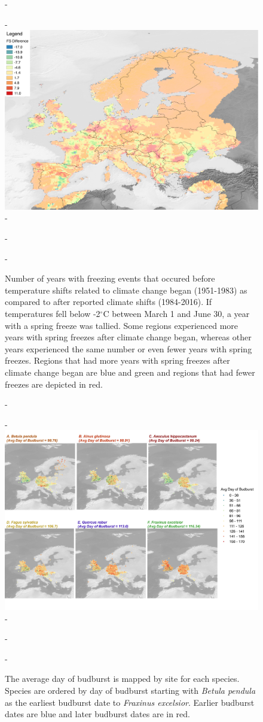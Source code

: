 \documentclass{article}\usepackage[]{graphicx}\usepackage[]{color}
\begin{document}
{\begin{figure} [H]
  -\begin{center}
  -\includegraphics[width=12cm]{..//figures/FS_Diff.pdf}
  -\caption{Number of years with freezing events that occured before temperature shifts related to climate change began (1951-1983) as compared to after reported climate shifts (1984-2016). If temperatures fell below -2$^{\circ}$C between March 1 and June 30, a year with a spring freeze was tallied. Some regions experienced more years with spring freezes after climate change began, whereas other years experienced the same number or even fewer years with spring freezes. Regions that had more years with spring freezes after climate change began are blue and green and regions that had fewer freezes are depicted in red.}\label{fig:region}
  -\end{center}
  -\end{figure}}
  
{\begin{figure} [H]
  -\begin{center}
  -\includegraphics[width=14cm]{..//figures/BB_gis.pdf}
  -\caption{The average day of budburst is mapped by site for each species. Species are ordered by day of budburst starting with \textit{Betula pendula} as the earliest budburst date to \textit{Fraxinus excelsior}. Earlier budburst dates are blue and later budburst dates are in red. }\label{fig:bbmap}
  -\end{center}
  -\end{figure}}
  
\end{document}
